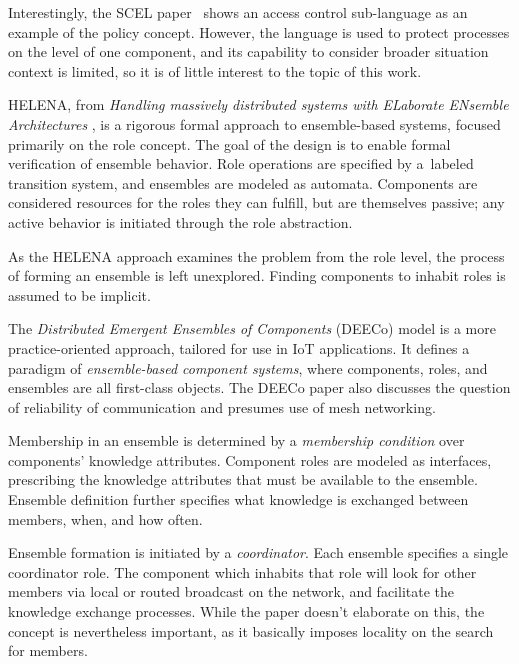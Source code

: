 Interestingly, the SCEL paper~\citep{SCEL2014} shows an access control sub-language as
an example of the policy concept. However, the language is used to protect processes on
the level of one component, and its capability to consider broader situation context is
limited, so it is of little interest to the topic of this work.

\medskip

HELENA, from \textit{Handling massively distributed systems with ELaborate ENsemble
Architectures} \citep{HELENA2014} \citep{HELENA2016}, is a rigorous formal approach to
ensemble-based systems, focused primarily on the role concept. The goal of the design is
to enable formal verification of ensemble behavior. Role operations are specified by
a~labeled transition system, and ensembles are modeled as automata. Components are
considered resources for the roles they can fulfill, but are themselves passive; any
active behavior is initiated through the role abstraction.

As the HELENA approach examines the problem from the role level, the process of forming
an ensemble is left unexplored. Finding components to inhabit roles is assumed to be
implicit.

\medskip

The \textit{Distributed Emergent Ensembles of Components} (DEECo) model
\citep{DEECo2016} is a more practice-oriented approach, tailored for use in IoT
applications. It defines a paradigm of \textit{ensemble-based component systems}, where
components, roles, and ensembles are all first-class objects. The DEECo paper also
discusses the question of reliability of communication and presumes use of mesh
networking.

Membership in an ensemble is determined by a \textit{membership condition} over
components' knowledge attributes. Component roles are modeled as interfaces, prescribing
the knowledge attributes that must be available to the ensemble. Ensemble definition
further specifies what knowledge is exchanged between members, when, and how often.

Ensemble formation is initiated by a \textit{coordinator}. Each ensemble specifies a
single coordinator role. The component which inhabits that role will look for other
members via local or routed broadcast on the network, and facilitate the knowledge
exchange processes. While the paper doesn't elaborate on this, the concept is
nevertheless important, as it basically imposes locality on the search for members.

\medskip

